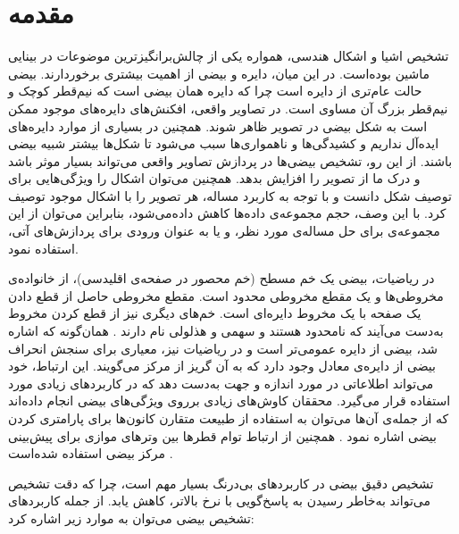 \documentclass[12pt,a4paper]{article}
\numberwithin{equation}{section}
\numberwithin{figure}{section}
\newcommand{\nocontentsline}[3]{}
\newcommand{\tocless}[2]{\bgroup\let\addcontentsline=\nocontentsline#1{#2}\egroup}
\theoremstyle{definition}
\theoremstyle{theorem}
\theoremstyle{definition}
\begin{document}
\newpage
\tocless\tableofcontents
\newpage 
{}
\section{مقدمه}
تشخیص اشیا و اشکال هندسی، همواره یکی از چالش‌برانگیزترین موضوعات در بینایی ماشین بوده‌است. در این میان، دایره و بیضی از اهمیت بیشتری برخوردارند. بیضی حالت عام‌تری از دایره است چرا که دایره همان بیضی است که نیم‌قطر کوچک و نیم‌قطر بزرگ آن مساوی است. در تصاویر واقعی، افکنش‌های دایره‌های موجود ممکن است به شکل بیضی در تصویر ظاهر شوند. همچنین در بسیاری از موارد دایره‌های ایده‌آل نداریم و کشیدگی‌ها و ناهمواری‌ها سبب می‌شود تا شکل‌ها بیشتر شبیه بیضی باشند. از این رو، تشخیص بیضی‌ها در پردازش تصاویر واقعی می‌تواند بسیار موثر باشد و درک ما از تصویر را افزایش بدهد. همچنین می‌توان اشکال را ویژگی‌هایی برای توصیف شکل دانست و با توجه به کاربرد مساله، هر تصویر را با اشکال موجود توصیف کرد. با این وصف، حجم مجموعه‌ی داده‌ها کاهش داده‌می‌شود، بنابراین می‌توان از این مجموعه‌ی برای حل مساله‌ی مورد نظر، و یا به عنوان ورودی برای پردازش‌های آتی، استفاده نمود. 

در ریاضیات، بیضی یک خم مسطح (خم محصور در صفحه‌ی اقلیدسی)، از خانواده‌ی مخروطی‌ها و یک مقطع مخروطی محدود است. مقطع مخروطی حاصل از قطع دادن یک صفحه با یک مخروط دایره‌ای است. خم‌های دیگری نیز از قطع کردن مخروط به‌دست می‌آیند که نامحدود هستند و سهمی و هذلولی نام دارند \cite{Wiki}. همان‌گونه که اشاره شد، بیضی از دایره عمومی‌تر است و در ریاضیات نیز، معیاری برای سنجش انحراف بیضی از دایره‌ی معادل وجود دارد که به آن گریز از مرکز می‌گویند. این ارتباط، خود می‌تواند اطلاعاتی در مورد اندازه و جهت به‌دست دهد که در کاربردهای زیادی مورد استفاده قرار می‌گیرد. محققان کاوش‌های زیادی برروی ویژگی‌های بیضی انجام داده‌اند که از جمله‌ی آن‌ها می‌توان به استفاده از طبیعت متقارن کانون‌ها برای پارامتری کردن بیضی اشاره نمود \cite{param}. همچنین از ارتباط توام قطرها بین وترهای موازی برای پیش‌بینی مرکز بیضی استفاده شده‌است \cite{diam}. 

تشخیص دقیق بیضی در کاربردهای بی‌درنگ بسیار مهم است، چرا که دقت تشخیص می‌تواند به‌خاطر رسیدن به پاسخ‌گویی با نرخ بالاتر، کاهش یابد. از جمله کاربردهای تشخیص بیضی می‌توان به موارد زیر اشاره کرد: 
\end{document}
